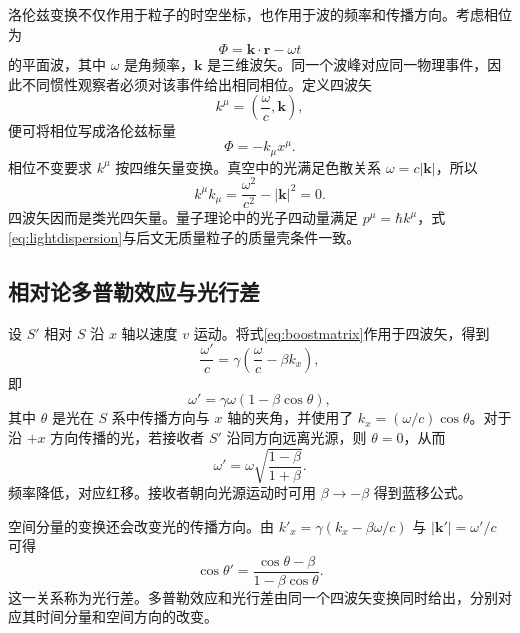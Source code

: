 \documentclass[style=classic,color=full]{lc-article}
\begin{document}
洛伦兹变换不仅作用于粒子的时空坐标，也作用于波的频率和传播方向。考虑相位为
\begin{equation}
  \Phi=\bm k\mathbin{\cdot}\bm r-\omega t
\end{equation}
的平面波，其中 $\omega$ 是角频率，$\bm k$ 是三维波矢。同一个波峰对应同一物理事件，因此不同惯性观察者必须对该事件给出相同相位。定义四波矢
\begin{equation}
  k^\mu=\left(\frac{\omega}{c},\bm k\right),
  \label{eq:fourwavevector}
\end{equation}
便可将相位写成洛伦兹标量
\begin{equation}
  \Phi=-k_\mu x^\mu.
\end{equation}
相位不变要求 $k^\mu$ 按四维矢量变换。真空中的光满足色散关系 $\omega=c\lvert\bm k\rvert$，所以
\begin{equation}
  k^\mu k_\mu
  =\frac{\omega^2}{c^2}-\lvert\bm k\rvert^2=0.
  \label{eq:lightdispersion}
\end{equation}
四波矢因而是类光四矢量。量子理论中的光子四动量满足 $p^\mu=\hbar k^\mu$，式\eqref{eq:lightdispersion}与后文无质量粒子的质量壳条件一致。

\subsection{相对论多普勒效应与光行差}

设 $S'$ 相对 $S$ 沿 $x$ 轴以速度 $v$ 运动。将式\eqref{eq:boostmatrix}作用于四波矢，得到
\begin{equation}
  \frac{\omega'}{c}
  =\gamma\left(\frac{\omega}{c}-\beta k_x\right),
\end{equation}
即
\begin{equation}
  \boxed{\omega'=\gamma\omega(1-\beta\cos\theta),}
  \label{eq:relativisticdoppler}
\end{equation}
其中 $\theta$ 是光在 $S$ 系中传播方向与 $x$ 轴的夹角，并使用了 $k_x=(\omega/c)\cos\theta$。对于沿 $+x$ 方向传播的光，若接收者 $S'$ 沿同方向远离光源，则 $\theta=0$，从而
\begin{equation}
  \omega'=\omega\sqrt{\frac{1-\beta}{1+\beta}}.
  \label{eq:longitudinaldoppler}
\end{equation}
频率降低，对应红移。接收者朝向光源运动时可用 $\beta\to-\beta$ 得到蓝移公式。

空间分量的变换还会改变光的传播方向。由 $k'_x=\gamma(k_x-\beta\omega/c)$ 与 $\lvert\bm k'\rvert=\omega'/c$ 可得
\begin{equation}
  \boxed{
  \cos\theta'
  =\frac{\cos\theta-\beta}
  {1-\beta\cos\theta}.}
  \label{eq:aberration}
\end{equation}
这一关系称为光行差。多普勒效应和光行差由同一个四波矢变换同时给出，分别对应其时间分量和空间方向的改变\cite{rindler,taylorwheeler}。
\end{document}
